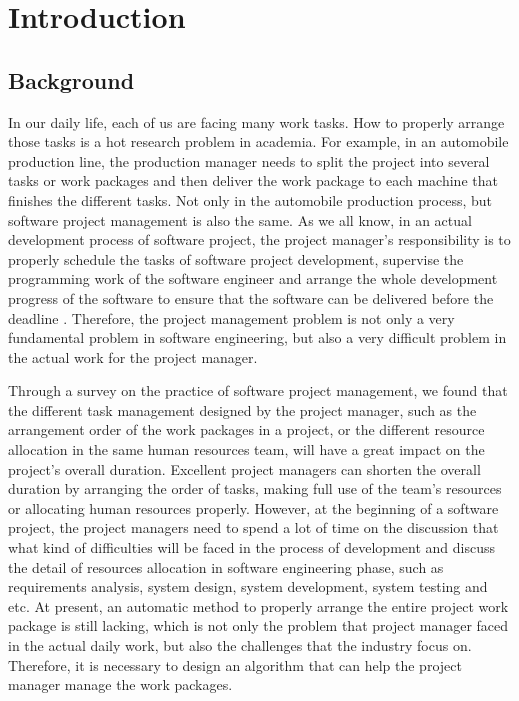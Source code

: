 
\section{Introduction}

\subsection{Background}
%
In our daily life, each of us are facing many work tasks.  How to properly 
arrange those tasks is a hot research problem in academia. For example, in an 
automobile production line, the production manager needs to split the project 
into several tasks or work packages and then deliver the work package to each 
machine that finishes the different tasks. Not only in the automobile 
production process, but software project management is also the same. As we 
all know, in an actual development process of software project, the project 
manager's responsibility is to properly schedule the tasks of software 
project development, supervise the programming work of the software engineer 
and arrange the whole development progress of the software to ensure that the 
software can be delivered before the deadline \cite{stellman}. Therefore, the 
project management problem is not only a very fundamental problem in software 
engineering, but also a very difficult problem in the actual work for the 
project manager.


Through a survey on the practice of software project management, we found 
that the different task management designed by the project manager, such as 
the arrangement order of the work packages in a project, or the different 
resource allocation in the same human resources team, will have a great 
impact on the project's overall duration. Excellent project managers can 
shorten the overall duration by arranging the order of tasks, making full use 
of the team’s resources or allocating human resources properly. However, at 
the beginning of a software project, the project managers need to spend a lot 
of time on the discussion that what kind of difficulties will be faced in the 
process of development and discuss the detail of resources allocation in 
software engineering phase, such as requirements analysis, system design, 
system development, system testing and etc. At present, an automatic method 
to properly arrange the entire project work package is still lacking, which 
is not only the problem that project manager faced in the actual daily work, 
but also the challenges that the industry focus on. Therefore, it is 
necessary to design an algorithm that can help the project manager manage the 
work packages.


